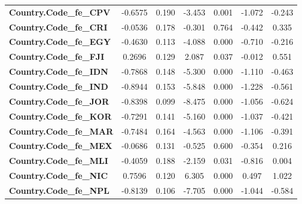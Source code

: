 \begin{center}
\begin{tabular}{lcccccc}
\textbf{Country.Code\_fe\_CPV}                                     &      -0.6575  &        0.190     &    -3.453  &         0.001        &       -1.072    &       -0.243     \\
\textbf{Country.Code\_fe\_CRI}                                     &      -0.0536  &        0.178     &    -0.301  &         0.764        &       -0.442    &        0.335     \\
\textbf{Country.Code\_fe\_EGY}                                     &      -0.4630  &        0.113     &    -4.088  &         0.000        &       -0.710    &       -0.216     \\
\textbf{Country.Code\_fe\_FJI}                                     &       0.2696  &        0.129     &     2.087  &         0.037        &       -0.012    &        0.551     \\
\textbf{Country.Code\_fe\_IDN}                                     &      -0.7868  &        0.148     &    -5.300  &         0.000        &       -1.110    &       -0.463     \\
\textbf{Country.Code\_fe\_IND}                                     &      -0.8944  &        0.153     &    -5.848  &         0.000        &       -1.228    &       -0.561     \\
\textbf{Country.Code\_fe\_JOR}                                     &      -0.8398  &        0.099     &    -8.475  &         0.000        &       -1.056    &       -0.624     \\
\textbf{Country.Code\_fe\_KOR}                                     &      -0.7291  &        0.141     &    -5.160  &         0.000        &       -1.037    &       -0.421     \\
\textbf{Country.Code\_fe\_MAR}                                     &      -0.7484  &        0.164     &    -4.563  &         0.000        &       -1.106    &       -0.391     \\
\textbf{Country.Code\_fe\_MEX}                                     &      -0.0686  &        0.131     &    -0.525  &         0.600        &       -0.354    &        0.216     \\
\textbf{Country.Code\_fe\_MLI}                                     &      -0.4059  &        0.188     &    -2.159  &         0.031        &       -0.816    &        0.004     \\
\textbf{Country.Code\_fe\_NIC}                                     &       0.7596  &        0.120     &     6.305  &         0.000        &        0.497    &        1.022     \\
\textbf{Country.Code\_fe\_NPL}                                     &      -0.8139  &        0.106     &    -7.705  &         0.000        &       -1.044    &       -0.584     \\
\bottomrule
\end{tabular}
\end{center}